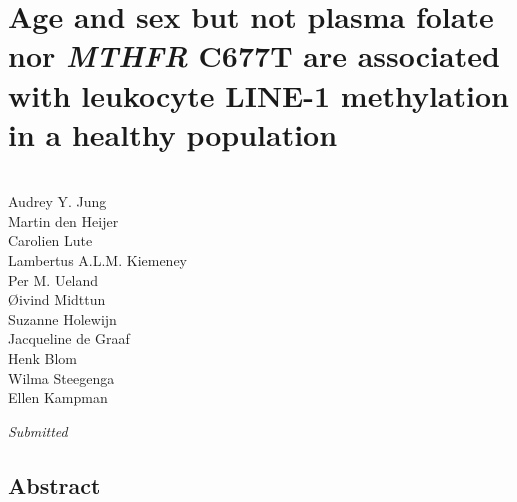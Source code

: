 \chapter[Age and sex but not plasma folate nor \emph{MTHFR} C677T are associated with leukocyte LINE-1 methylation in a healthy population]{Age and sex but not plasma folate nor \emph{MTHFR} C677T are associated with leukocyte LINE-1 methylation in a healthy population} 
\label{chap3_nbs} 

\quad\\

\noindent
Audrey Y. Jung\\
Martin den Heijer\\
Carolien Lute\\
Lambertus A.L.M. Kiemeney\\
Per M. Ueland\\
{\O}ivind Midttun\\
Suzanne Holewijn\\
Jacqueline de Graaf\\
Henk Blom\\
Wilma Steegenga\\
Ellen Kampman\\

\begin{table}[b]
\emph{Submitted}
\end{table}

\newpage

\section*{Abstract}

